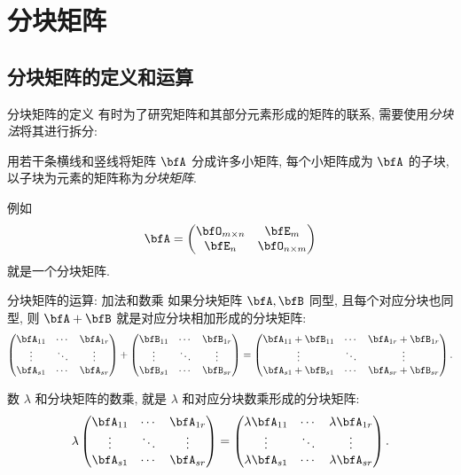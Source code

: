 \section{分块矩阵}

\subsection{分块矩阵的定义和运算}

\begin{frame}{分块矩阵的定义}
	\onslide<+->
	有时为了研究矩阵和其部分元素形成的矩阵的联系, 需要使用\emph{分块法}将其进行拆分:
	\onslide<+->
	\begin{definition}
		用若干条横线和竖线将矩阵 $\bfA$ 分成许多小矩阵, 每个小矩阵成为 $\bfA$ 的子块, 以子块为元素的矩阵称为\emph{分块矩阵}.
	\end{definition}
	\onslide<+->
	例如
	\[\bfA=\begin{pmatrix}
		\bfO_{m\times n}&\bfE_m\\
		\bfE_n&\bfO_{n\times m}
	\end{pmatrix}\]
	就是一个分块矩阵.
\end{frame}


\begin{frame}{分块矩阵的运算: 加法和数乘}
	\onslide<+->
	如果分块矩阵 $\bfA,\bfB$ 同型, 且每个对应分块也同型, 则 $\bfA+\bfB$ 就是对应分块相加形成的分块矩阵:
	\[\begin{pmatrix}
		\bfA_{11}&\cdots&\bfA_{1r}\\
		\vdots&\ddots&\vdots\\
		\bfA_{s1}&\cdots&\bfA_{sr}
	\end{pmatrix}+\begin{pmatrix}
		\bfB_{11}&\cdots&\bfB_{1r}\\
		\vdots&\ddots&\vdots\\
		\bfB_{s1}&\cdots&\bfB_{sr}
	\end{pmatrix}=\begin{pmatrix}
		\bfA_{11}+\bfB_{11}&\cdots&\bfA_{1r}+\bfB_{1r}\\
		\vdots&\ddots&\vdots\\
		\bfA_{s1}+\bfB_{s1}&\cdots&\bfA_{sr}+\bfB_{sr}
	\end{pmatrix}.\]

	\onslide<+->
	数 $\lambda$ 和分块矩阵的数乘, 就是 $\lambda$ 和对应分块数乘形成的分块矩阵:
	\[\lambda\begin{pmatrix}
		\bfA_{11}&\cdots&\bfA_{1r}\\
		\vdots&\ddots&\vdots\\
		\bfA_{s1}&\cdots&\bfA_{sr}
	\end{pmatrix}=\begin{pmatrix}
		\lambda\bfA_{11}&\cdots&\lambda\bfA_{1r}\\
		\vdots&\ddots&\vdots\\
		\lambda\bfA_{s1}&\cdots&\lambda\bfA_{sr}
	\end{pmatrix}.\]
\end{frame}



